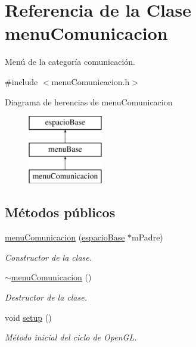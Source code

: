 \hypertarget{classmenu_comunicacion}{}\section{Referencia de la Clase menu\+Comunicacion}
\label{classmenu_comunicacion}


Menú de la categoría comunicación.  




{\ttfamily \#include $<$menu\+Comunicacion.\+h$>$}

Diagrama de herencias de menu\+Comunicacion\begin{figure}[H]
\begin{center}
\leavevmode
\includegraphics[height=3.000000cm]{classmenu_comunicacion}
\end{center}
\end{figure}
\subsection*{Métodos públicos}
\begin{DoxyCompactItemize}
\item 
\hyperlink{classmenu_comunicacion_a9a96fdc1109e1b41e4928f35833cd445}{menu\+Comunicacion} (\hyperlink{classespacio_base}{espacio\+Base} $\ast$m\+Padre)
\begin{DoxyCompactList}\small\item\em Constructor de la clase. \end{DoxyCompactList}\item 
\hyperlink{classmenu_comunicacion_a16b316cb60f2a95ae40bdc1a7fe26777}{$\sim$menu\+Comunicacion} ()
\begin{DoxyCompactList}\small\item\em Destructor de la clase. \end{DoxyCompactList}\item 
void \hyperlink{classmenu_comunicacion_a9e42e30977954e20c304261a9f1be5e1}{setup} ()
\begin{DoxyCompactList}\small\item\em Método inicial del ciclo de Open\+G\+L. \end{DoxyCompactList}\end{DoxyCompactItemize}
